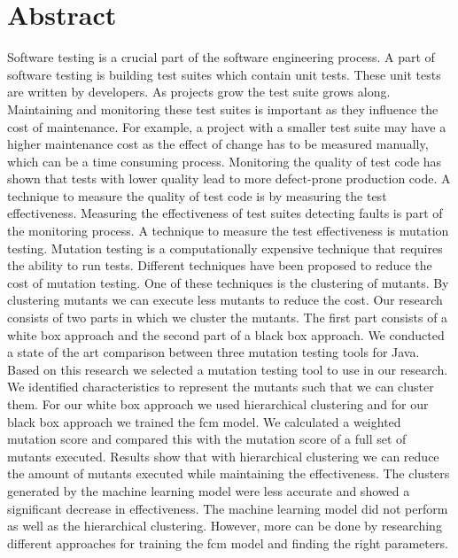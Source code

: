 \documentclass[../main]{subfiles}
\begin{document}
\chapter*{Abstract}
Software testing is a crucial part of the software engineering process. 
A part of software testing is building test suites which contain unit tests.
These unit tests are written by developers. 
As projects grow the test suite grows along.
Maintaining and monitoring these test suites is important as they influence the cost of maintenance.
For example, a project with a smaller test suite may have a higher maintenance cost as the effect of change has to be measured manually, which can be a time consuming process.
Monitoring the quality of test code has shown that tests with lower quality lead to more defect-prone production code.
A technique to measure the quality of test code is by measuring the test effectiveness.
\newline
Measuring the effectiveness of test suites detecting faults is part of the monitoring process.
A technique to measure the test effectiveness is mutation testing.
Mutation testing is a computationally expensive technique that requires the ability to run tests.
Different techniques have been proposed to reduce the cost of mutation testing.
One of these techniques is the clustering of mutants.
By clustering mutants we can execute less mutants to reduce the cost.
\newline
Our research consists of two parts in which we cluster the mutants.
The first part consists of a white box approach and the second part of a black box approach.
We conducted a state of the art comparison between three mutation testing tools for Java.
Based on this research we selected a mutation testing tool to use in our research.
\newline
We identified characteristics to represent the mutants such that we can cluster them.
For our white box approach we used hierarchical clustering and for our black box approach we trained the \acrlong{fcm} model.
We calculated a weighted mutation score and compared this with the mutation score of a full set of mutants executed.
Results show that with hierarchical clustering we can reduce the amount of mutants executed while maintaining the effectiveness.
The clusters generated by the machine learning model were less accurate and showed a significant decrease in effectiveness.
The machine learning model did not perform as well as the hierarchical clustering.
However, more can be done by researching different approaches for training the \acrshort{fcm} model and finding the right parameters. 
\end{document}
